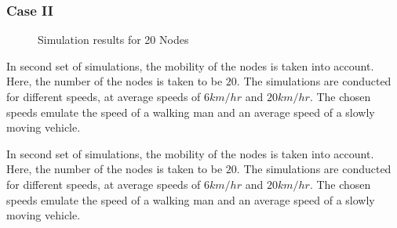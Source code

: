 \documentclass[journal]{IEEEtran}
\begin{document}
\subsubsection{\textbf{Case II}}
\begin{figure}
\centerline{
 \hfil {}} \caption{Simulation results for 20 Nodes}
\label{16output}
\end{figure}
In second set of simulations, the mobility of the nodes is taken into account. Here, the number of the nodes is taken to be $20$. The simulations are conducted for different speeds, at average speeds of $6km/hr$ and $20km/hr$. The chosen speeds emulate the speed of a walking man and an average speed of a slowly moving vehicle.
\par
In second set of simulations, the mobility of the nodes is taken
into account. Here, the number of the nodes is taken to be $20$. The
simulations are conducted for different speeds, at average speeds of
$6km/hr$ and $20km/hr$. The chosen speeds emulate the speed of a
walking man and an average speed of a slowly moving vehicle.
\end{document}
